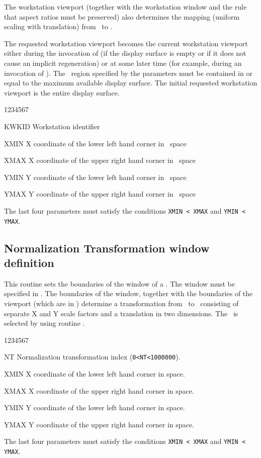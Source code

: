 The workstation viewport (together with the workstation window and the rule that
aspect ratios must be preserved) also determines the mapping (uniform scaling
with translation) from \NDC~to \DC.

The requested workstation viewport becomes the current workstation viewport
either during the invocation of  (if the display surface is empty
or if it does not cause an implicit regeneration) or at some later time (for
example, during an invocation of ). The \DC~region
specified by the parameters must be contained in  or equal to the maximum
available display  surface. The initial requested workstation viewport is the
entire display surface.
\Pdesc
\begin{DLtt}{1234567}
\item[KWKID]Workstation identifier
\item[XMIN] X coordinate of the lower left hand corner in \dc~space
\item[XMAX] X coordinate of the upper right hand corner in \dc~space
\item[YMIN] Y coordinate of the lower left hand corner in \dc~space
\item[YMAX] Y coordinate of the upper right hand corner in \dc~space
\end{DLtt}
The last four parameters must satisfy the conditions {\tt XMIN < XMAX} and
{\tt YMIN < YMAX}.
%
\subsection{Normalization Transformation window definition}
\Action
This routine sets the boundaries of the window of a \NT. The window must be
specified in \WC. The boundaries of the window, together with the
boundaries of the viewport (which are in \NDC)
determine a transformation from \WC~to \NDC~consisting of
separate X and Y scale factors and a translation in two dimensions. The \NT~is
selected by using routine .
\Pdesc
\begin{DLtt}{1234567}
\item[NT]   Normalization transformation index ({\tt 0<NT<1000000}).
\item[XMIN] X coordinate of the lower left hand corner in \wc{} space.
\item[XMAX] X coordinate of the upper right hand corner in \wc{} space.
\item[YMIN] Y coordinate of the lower left hand corner in \wc{} space.
\item[YMAX] Y coordinate of the upper right hand corner in \wc{} space.
\end{DLtt}
The last four parameters must satisfy the conditions {\tt XMIN < XMAX} and
{\tt YMIN < YMAX}.
%
